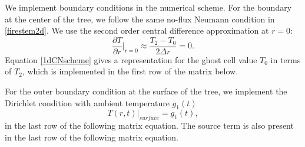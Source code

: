 \documentclass{IEEEtran} %
\begin{document}
We implement boundary conditions in the numerical scheme. For the boundary at the center of the tree, we follow the same no-flux Neumann condition in \ref{firestem2d}. We use the second order central difference approximation at $r=0$: 
\begin{equation}
    \frac{\partial T}{\partial r}\bigg|_{r=0}\approx \frac{T_2-T_0}{2\Delta r}=0.
\end{equation} %
Equation \eqref{1dCNscheme} gives a representation for the ghost cell value $T_0$ in terms of $T_2$, which is implemented in the first row of the matrix below. 

For the outer boundary condition at the surface of the tree, we implement the Dirichlet condition with ambient temperature $g_1(t)$
\begin{equation}
    T(r,t)\bigg|_{surface}=g_1(t),
\end{equation}
in the last row of the following matrix equation. The source term is also present in the last row of the following matrix equation.
\end{document}
